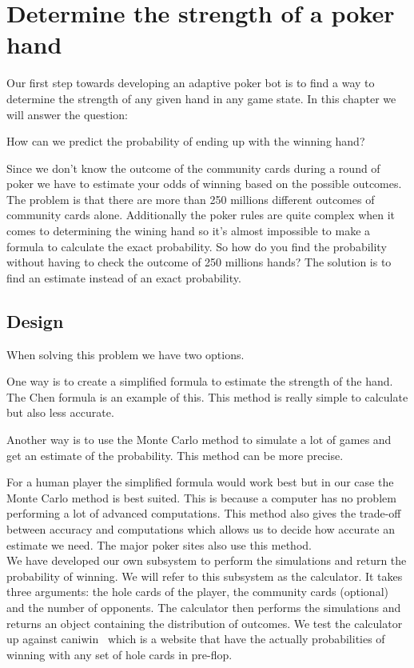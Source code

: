 \section{Determine the strength of a poker hand}
\label{sec:part1}
Our first step towards developing an adaptive poker bot is to find a way to determine the strength of any given hand in any game state. In this chapter we will answer the question: 

\vspace{4mm}
\begin{statementBox}
How can we predict the probability of ending up with the winning hand?
\end{statementBox}
\vspace{4mm}

Since we don't know the outcome of the community cards during a round of poker we have to estimate your odds of winning based on the possible outcomes. The problem is that there are more than 250 millions different outcomes of community cards alone. Additionally the poker rules are quite complex when it comes to determining the wining hand so it's almost impossible to make a formula to calculate the exact probability. So how do you find the probability without having to check the outcome of 250 millions hands? 
The solution is to find an estimate instead of an exact probability.

\subsection{Design}
When solving this problem we have two options.

One way is to create a simplified formula to estimate the strength of the hand. The Chen formula is an example of this. This method is really simple to calculate but also less accurate.

Another way is to use the Monte Carlo method to simulate a lot of games and get an estimate of the probability. This  method can be more precise. 

For a human player the simplified formula would work best but in our case the Monte Carlo method is best suited. This is because a computer has no problem performing a lot of advanced computations. This method also gives the trade-off between accuracy and computations which allows us to decide how accurate an estimate we need. The major poker sites also use this method.\\

We have developed our own subsystem to perform the simulations and return the probability of winning. We will refer to this subsystem as the calculator. It takes three arguments: the hole cards of the player, the community cards (optional) and the number of opponents. The calculator then performs the simulations and returns an object containing the distribution of outcomes.
We test the calculator up against caniwin~\cite{caniwin} which is a website that have the actually probabilities of winning with any set of hole cards in pre-flop.

